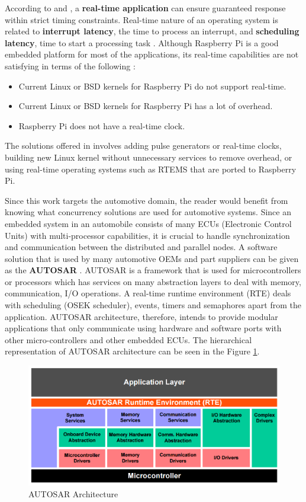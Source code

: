 According to \cite{rtrpi1} and \cite{rtrpi2}, a \textbf{real-time application} can ensure guaranteed response within strict timing constraints. Real-time nature of an operating system is related to \textbf{interrupt latency}, the time to process an interrupt, and \textbf{scheduling latency}, time to start a processing task \cite{rtrpi2}. Although Raspberry Pi is a good embedded platform for most of the applications, its real-time capabilities are not satisfying in terms of the following \cite{rtrpi2}:
\begin{itemize}
	\item Current Linux or BSD kernels for Raspberry Pi do not support real-time.
	\item Current Linux or BSD kernels for Raspberry Pi has a lot of overhead.
	\item Raspberry Pi does not have a real-time clock. 
\end{itemize}

The solutions offered in \cite{rtrpi2} involves adding pulse generators or real-time clocks, building new Linux kernel without unnecessary services to remove overhead, or using real-time operating systems such as RTEMS that are ported to Raspberry Pi.

Since this work targets the automotive domain, the reader would benefit from knowing what concurrency solutions are used for automotive systems. Since an embedded system in an automobile consists of many ECUs (Electronic Control Units) with multi-processor capabilities, it is crucial to handle synchronization and communication between the distributed and parallel nodes. A software solution that is used by many automotive OEMs and part suppliers can be given as the \textbf{AUTOSAR} \cite{autosararch}. AUTOSAR is a framework that is used for microcontrollers or processors which has services on many abstraction layers to deal with memory, communication, I/O operations. A real-time runtime environment (RTE) deals with scheduling (OSEK scheduler), events, timers and semaphores apart from the application. AUTOSAR architecture, therefore, intends to provide modular applications that only communicate using hardware and software ports with other micro-controllers and other embedded ECUs. The hierarchical representation of AUTOSAR architecture can be seen in the Figure \ref{fig:autosararch}.

\begin{figure}[!ht]
	\centering
	\captionsetup{justification=centering}
	\includegraphics[scale=0.35]{content/images/autosararch.png}
	\caption{AUTOSAR Architecture \cite{autosararch}}
	\label{fig:autosararch}
\end{figure}

